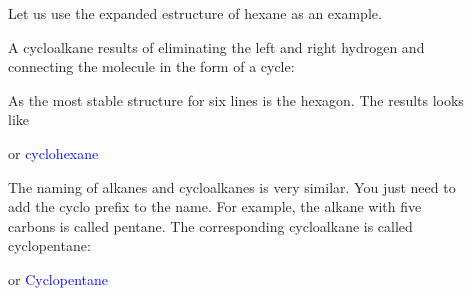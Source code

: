 \documentclass[main.tex]{subfiles}
\begin{document}
\begin{description}
\item[] Let us use the expanded estructure of hexane as an example. 
\begin{center}\end{center}
A cycloalkane results of eliminating the left and right hydrogen and connecting the molecule in the form of a cycle:
\begin{center}\end{center}

As the most stable structure for six lines is the hexagon. The results looks like

\begin{center}\hspace{1cm} or \hspace{1cm}  \hspace{0.5cm}\textcolor{blue}{cyclohexane}\end{center}

\item[] The naming of alkanes and cycloalkanes is very similar. You just need to add the cyclo prefix to the name. For example, the alkane with five carbons is called pentane. The corresponding cycloalkane is called cyclopentane:
\begin{center}\hspace{1cm} or \hspace{1cm}  \hspace{0.5cm}\textcolor{blue}{Cyclopentane}\end{center}



 















\end{description}
\end{document}
